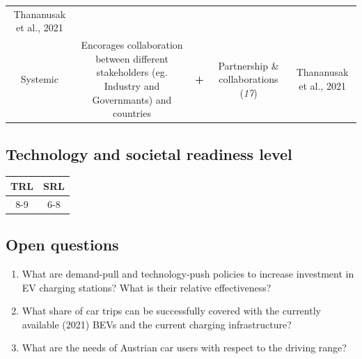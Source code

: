\documentclass[
]{book}
\providecommand{\tightlist}{%
  \setlength{\itemsep}{0pt}\setlength{\parskip}{0pt}}
\begin{document}
\begin{longtable}[]{@{}ccccc@{}}
\begin{minipage}[t]{0.17\columnwidth}
Thananusak et al., 2021\strut
\end{minipage}\tabularnewline
\begin{minipage}[t]{0.17\columnwidth}\centering
Systemic\strut
\end{minipage} & \begin{minipage}[t]{0.16\columnwidth}\centering
Encorages collaboration between different stakeholders (eg. Industry and Governmants) and countries\strut
\end{minipage} & \begin{minipage}[t]{0.17\columnwidth}\centering
\textbf{+}\strut
\end{minipage} & \begin{minipage}[t]{0.17\columnwidth}\centering
Partnership \& collaborations (\emph{17})\strut
\end{minipage} & \begin{minipage}[t]{0.17\columnwidth}\centering
Thananusak et al., 2021\strut
\end{minipage}\tabularnewline
\bottomrule
\end{longtable}

\hypertarget{technology-and-societal-readiness-level-5}{%
\subsection*{Technology and societal readiness level}\label{technology-and-societal-readiness-level-5}}

\begin{longtable}[]{@{}cc@{}}
\toprule
TRL & SRL\tabularnewline
\midrule
\endhead
8-9 & 6-8\tabularnewline
\bottomrule
\end{longtable}

\hypertarget{open-questions-5}{%
\subsection*{Open questions}\label{open-questions-5}}

\begin{enumerate}
\def\labelenumi{\arabic{enumi}.}
\tightlist
\item
  What are demand-pull and technology-push policies to increase investment in EV charging stations? What is their relative effectiveness?
\item
  What share of car trips can be successfully covered with the currently available (2021) BEVs and the current charging infrastructure?
\item
  What are the needs of Austrian car users with respect to the driving range?
\end{enumerate}
\end{document}
